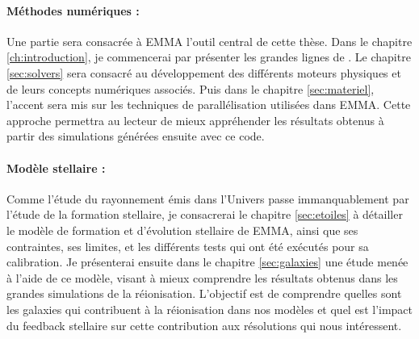 \paragraph{Méthodes numériques :}
Une partie sera consacrée à EMMA l'outil central de cette thèse.
Dans le chapitre \ref{ch:introduction}, je commencerai par présenter les grandes lignes de \emma. %
Le chapitre \ref{sec:solvers} sera consacré au développement des différents moteurs physiques et de leurs concepts numériques associés.
Puis dans le chapitre \ref{sec:materiel}, l'accent sera mis sur les techniques de parallélisation utilisées dans EMMA.
Cette approche permettra au lecteur de mieux appréhender les résultats obtenus à partir des simulations générées ensuite avec ce code.

\paragraph{Modèle stellaire :}
Comme l'étude du rayonnement émis dans l'Univers passe immanquablement par l'étude de la formation stellaire, je consacrerai le chapitre \ref{sec:etoiles} à détailler le modèle de formation et d'évolution stellaire de EMMA, ainsi que ses contraintes, ses limites, et les différents tests qui ont été exécutés pour sa calibration.
Je présenterai ensuite dans le chapitre \ref{sec:galaxies} une étude menée à l'aide de ce modèle, visant à mieux comprendre les résultats obtenus dans les grandes simulations de la réionisation.
L'objectif est de comprendre quelles sont les galaxies qui contribuent à la réionisation dans nos modèles et quel est l'impact du feedback stellaire sur cette contribution aux résolutions qui nous intéressent.

